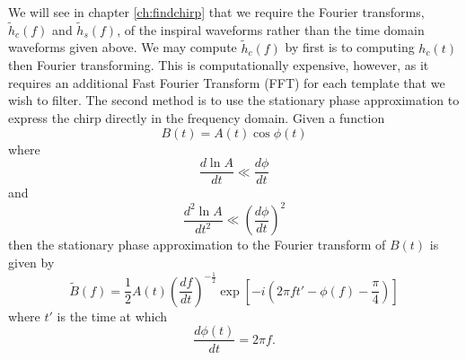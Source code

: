 We will see in chapter \ref{ch:findchirp} that we require the Fourier
transforms, $\tilde{h}_c(f)$ and $\tilde{h}_s(f)$, of the inspiral waveforms
rather than the time domain waveforms given above. We may compute
$\tilde{h}_c(f)$ by first is to computing $h_c(t)$ then Fourier transforming.
This is computationally expensive, however, as it requires an additional Fast
Fourier Transform (FFT) for each template that we wish to filter. The second
method is to use the stationary phase approximation\cite{Mathews:1992} to
express the chirp directly in the frequency
domain\cite{WillWiseman:1996,Cutler:1994}. Given a function
\begin{equation}
B(t) = A(t) \cos \phi(t)
\end{equation}
where
\begin{equation}
\frac{d\ln A}{dt} \ll \frac{d\phi}{dt}
\end{equation}
and
\begin{equation}
\frac{d^2\ln A}{dt^2} \ll \left(\frac{d\phi}{dt}\right)^2
\end{equation}
then the stationary phase approximation to the Fourier transform of $B(t)$ is
given by
\begin{equation}
\tilde{B}(f) = \frac{1}{2} A(t) \left(\frac{df}{dt}\right)^{-\frac{1}{2}}
\exp\left[ -i \left(2\pi f t' - \phi(f) - \frac{\pi}{4} \right)\right]
\label{eq:spexpression}
\end{equation}
where $t'$ is the time at which
\begin{equation}
\frac{d\phi(t)}{dt} = 2\pi f.
\end{equation}


